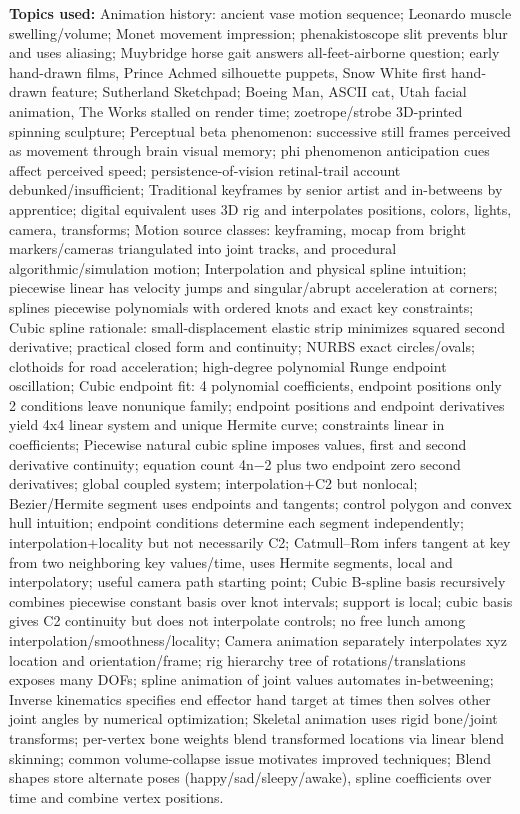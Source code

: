 \textbf{Topics used:} Animation history: ancient vase motion sequence; Leonardo muscle swelling/volume; Monet movement impression; phenakistoscope slit prevents blur and uses aliasing; Muybridge horse gait answers all-feet-airborne question; early hand-drawn films, Prince Achmed silhouette puppets, Snow White first hand-drawn feature; Sutherland Sketchpad; Boeing Man, ASCII cat, Utah facial animation, The Works stalled on render time; zoetrope/strobe 3D-printed spinning sculpture; Perceptual beta phenomenon: successive still frames perceived as movement through brain visual memory; phi phenomenon anticipation cues affect perceived speed; persistence-of-vision retinal-trail account debunked/insufficient; Traditional keyframes by senior artist and in-betweens by apprentice; digital equivalent uses 3D rig and interpolates positions, colors, lights, camera, transforms; Motion source classes: keyframing, mocap from bright markers/cameras triangulated into joint tracks, and procedural algorithmic/simulation motion; Interpolation and physical spline intuition; piecewise linear has velocity jumps and singular/abrupt acceleration at corners; splines piecewise polynomials with ordered knots and exact key constraints; Cubic spline rationale: small-displacement elastic strip minimizes squared second derivative; practical closed form and continuity; NURBS exact circles/ovals; clothoids for road acceleration; high-degree polynomial Runge endpoint oscillation; Cubic endpoint fit: 4 polynomial coefficients, endpoint positions only 2 conditions leave nonunique family; endpoint positions and endpoint derivatives yield 4x4 linear system and unique Hermite curve; constraints linear in coefficients; Piecewise natural cubic spline imposes values, first and second derivative continuity; equation count 4n−2 plus two endpoint zero second derivatives; global coupled system; interpolation+C2 but nonlocal; Bezier/Hermite segment uses endpoints and tangents; control polygon and convex hull intuition; endpoint conditions determine each segment independently; interpolation+locality but not necessarily C2; Catmull--Rom infers tangent at key from two neighboring key values/time, uses Hermite segments, local and interpolatory; useful camera path starting point; Cubic B-spline basis recursively combines piecewise constant basis over knot intervals; support is local; cubic basis gives C2 continuity but does not interpolate controls; no free lunch among interpolation/smoothness/locality; Camera animation separately interpolates xyz location and orientation/frame; rig hierarchy tree of rotations/translations exposes many DOFs; spline animation of joint values automates in-betweening; Inverse kinematics specifies end effector hand target at times then solves other joint angles by numerical optimization; Skeletal animation uses rigid bone/joint transforms; per-vertex bone weights blend transformed locations via linear blend skinning; common volume-collapse issue motivates improved techniques; Blend shapes store alternate poses (happy/sad/sleepy/awake), spline coefficients over time and combine vertex positions.

